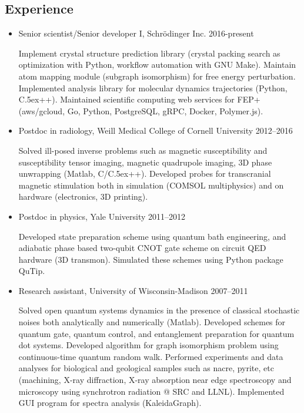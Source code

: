 \documentclass[centered,11pt,overlapped]{res}
\def\Cplusplus{{\rm C\raise.5ex\hbox{\small ++}}}
\begin{document}
\begin{resume}
\section{\sc Experience}

\begin{itemize}[leftmargin=-0.02in]
\item Senior scientist/Senior developer I, Schr\"odinger Inc. \hfill 2016-present

Implement crystal structure prediction library (crystal packing search as optimization with Python, workflow automation with GNU Make).
Maintain atom mapping module (subgraph isomorphism) for free energy perturbation.
Implemented analysis library for molecular dynamics trajectories (Python, \Cplusplus).
Maintained scientific computing web services for FEP+ (aws/gcloud, Go, Python, PostgreSQL, gRPC, Docker, Polymer.js).

\item Postdoc in radiology, Weill Medical College of Cornell University \hfill 2012--2016

Solved ill-posed inverse problems such as magnetic susceptibility and
susceptibility tensor imaging, magnetic quadrupole imaging, 3D phase unwrapping
(Matlab, C/\Cplusplus).
Developed probes for transcranial magnetic stimulation both in simulation (COMSOL multiphysics)
and on hardware (electronics, 3D printing).

\item Postdoc in physics, Yale University \hfill 2011--2012

Developed state preparation scheme using quantum bath engineering, and adiabatic
phase based two-qubit CNOT gate scheme on circuit QED hardware (3D transmon).
Simulated these schemes using Python package QuTip.

\item {Research assistant, University of Wisconsin-Madison} \hfill {2007--2011}

Solved open quantum systems dynamics in the presence of classical stochastic noises
both analytically and numerically (Matlab).
Developed schemes for quantum gate, quantum control, and entanglement preparation
for quantum dot systems.
Developed algorithm for graph isomorphism problem using continuous-time quantum random walk.
Performed experiments and data analyses for biological and geological samples such as nacre, pyrite, etc
(machining, X-ray diffraction, X-ray absorption near edge spectroscopy and
microscopy using synchrotron radiation @ SRC and LLNL).
Implemented GUI program for spectra analysis (KaleidaGraph).


\end{itemize}
\end{resume}
\end{document}
